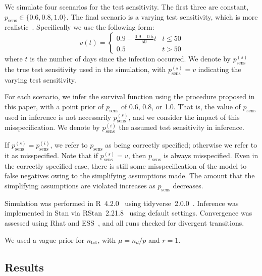 \documentclass[12pt]{article}
\newcommand{\psens}{p_\text{sens}}
\newcommand{\psenss}{p_\text{sens}^{(s)}}
\newcommand{\psensi}{p_\text{sens}^{(i)}}
\newcommand{\ntot}{n_\text{tot}}
\begin{document}
We simulate four scenarios for the test sensitivity.
The first three are constant, $\psens \in \{ 0.6, 0.8, 1.0 \}$.
The final scenario is a varying test sensitivity, which is more realistic~\citep{blakeThesis}.
Specifically we use the following form:
\begin{equation}
  v(t) = \begin{cases}
    0.9 - \frac{0.9-0.5}{50}t &t \leq 50 \\
    0.5 &t > 50
  \end{cases}
  \label{imperf-test:eq:variable-test-sensitivity}
\end{equation}
where $t$ is the number of days since the infection occurred.
We denote by $\psenss$ the true test sensitivity used in the simulation, with $\psenss = v$ indicating the varying test sensitivity.

For each scenario, we infer the survival function using the procedure proposed in this paper, with a point prior of $\psens$ of 0.6, 0.8, or 1.0.
That is, the value of $\psens$ used in inference is not necessarily $\psenss$, and we consider the impact of this misspecification.
We denote by $\psensi$ the assumed test sensitivity in inference.

If $\psenss = \psensi$, we refer to $\psens$ as being correctly specified; otherwise we refer to it as misspecified.
Note that if $\psenss = v$, then $\psens$ is always misspecified.
Even in the correctly specified case, there is still some misspecification of the model to false negatives owing to the simplifying assumptions made.
The amount that the simplifying assumptions are violated increases as $\psens$ decreases.

Simulation was performed in R~4.2.0~\citep{R-4-2-0} using tidyverse~2.0.0~\citep{tidyverse}.
Inference was implemented in Stan via RStan~2.21.8~\citep{rstan2-21-8} using default settings.
Convergence was assessed using Rhat and ESS~\cite{vehtariRhat}, and all runs checked for divergent transitions.

We used a vague prior for $\ntot$, with $\mu = n_d / p$ and $r = 1$.

\subsection{Results}
\end{document}
